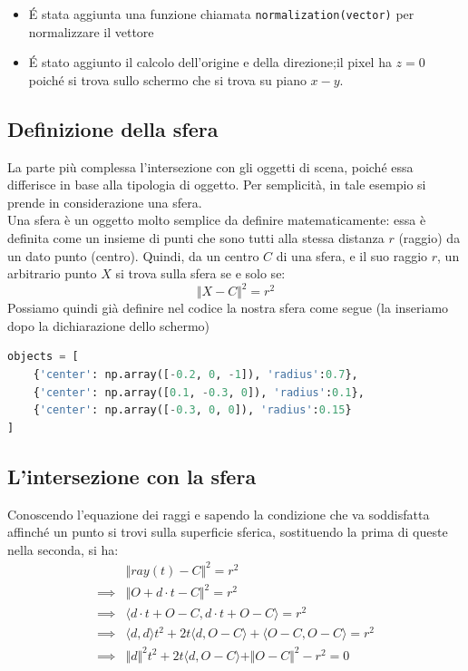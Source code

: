\documentclass[9pt,a4paper,twoside]{tau}
\begin{document}
\begin{itemize}
	\item \'E stata aggiunta una funzione chiamata \texttt{normalization(vector)} per normalizzare il vettore
	\item \'E stato aggiunto il calcolo dell'origine e della direzione;il pixel ha $z=0$ poiché si trova sullo schermo che si trova su piano $x-y$.
\end{itemize}

\subsection{Definizione della sfera}
La parte più complessa l'intersezione con gli oggetti di scena, poiché essa differisce in base alla tipologia di oggetto. Per semplicità, in tale esempio si prende in considerazione una sfera.\\
Una sfera è un oggetto molto semplice da definire matematicamente: essa è definita come un insieme di punti che sono tutti alla stessa distanza $r$ (raggio) da un dato punto (centro). Quindi, da un centro $C$ di una sfera, e il suo raggio $r$, un arbitrario punto $X$ si trova sulla sfera se e solo se:
\begin{equation*}
	\Vert X - C \Vert^2 = r^2
\end{equation*}
Possiamo quindi già definire nel codice la nostra sfera come segue (la inseriamo dopo la dichiarazione dello schermo)

\begin{lstlisting}[language=Python]
objects = [
    {'center': np.array([-0.2, 0, -1]), 'radius':0.7},
    {'center': np.array([0.1, -0.3, 0]), 'radius':0.1},
    {'center': np.array([-0.3, 0, 0]), 'radius':0.15}
]
\end{lstlisting}

\subsection{L'intersezione con la sfera}
Conoscendo l'equazione dei raggi e sapendo la condizione che va soddisfatta affinché un punto si trovi sulla superficie sferica, sostituendo la prima di queste nella seconda, si ha:
\begin{equation*}
	\begin{split}
		&\Vert ray(t) - C\Vert^2 = r^2\\
		\implies & \Vert O + d\cdot t - C \Vert^2 = r^2 \\
		\implies & \langle d\cdot t + O - C, d\cdot t + O - C\rangle = r^2 \\
		\implies & \langle d, d\rangle t^2 + 2t\langle d, O-C\rangle + \langle O-C, O-C\rangle = r^2 \\
		\implies & \Vert d\Vert ^2 t^2 + 2t\langle d, O-C \rangle + \Vert O-C\Vert ^2 - r^2 = 0
	\end{split}
\end{equation*}
\end{document}
